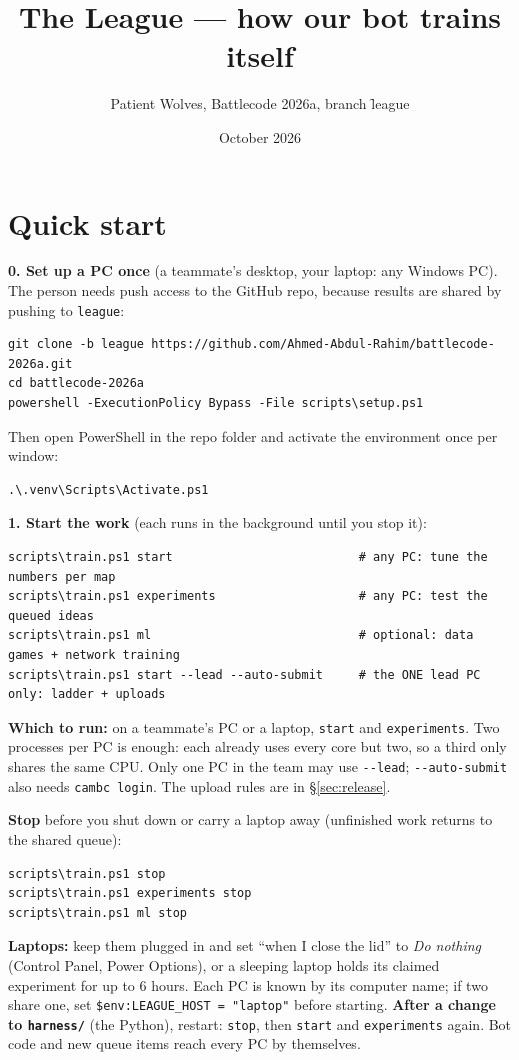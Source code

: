 \documentclass[11pt,a4paper]{article}
\title{The League --- how our bot trains itself}
\author{Patient Wolves, Battlecode 2026a, branch \f{league}}
\date{October 2026}
\newcommand{\f}[1]{\texttt{#1}}
\begin{document}
\maketitle

\section*{Quick start}
\textbf{0. Set up a PC once} (a teammate's desktop, your laptop: any Windows PC). The person needs
push access to the GitHub repo, because results are shared by pushing to \f{league}:
\begin{lstlisting}
git clone -b league https://github.com/Ahmed-Abdul-Rahim/battlecode-2026a.git
cd battlecode-2026a
powershell -ExecutionPolicy Bypass -File scripts\setup.ps1
\end{lstlisting}
Then open PowerShell in the repo folder and activate the environment once per window:
\begin{lstlisting}
.\.venv\Scripts\Activate.ps1
\end{lstlisting}

\textbf{1. Start the work} (each runs in the background until you stop it):
\begin{lstlisting}
scripts\train.ps1 start                          # any PC: tune the numbers per map
scripts\train.ps1 experiments                    # any PC: test the queued ideas
scripts\train.ps1 ml                             # optional: data games + network training
scripts\train.ps1 start --lead --auto-submit     # the ONE lead PC only: ladder + uploads
\end{lstlisting}
\textbf{Which to run:} on a teammate's PC or a laptop, \f{start} and \f{experiments}. Two processes
per PC is enough: each already uses every core but two, so a third only shares the same CPU. Only
one PC in the team may use \f{-{}-lead}; \f{-{}-auto-submit} also needs \f{cambc login}. The upload
rules are in \S\ref{sec:release}.

\textbf{Stop} before you shut down or carry a laptop away (unfinished work returns to the shared
queue):
\begin{lstlisting}
scripts\train.ps1 stop
scripts\train.ps1 experiments stop
scripts\train.ps1 ml stop
\end{lstlisting}
\textbf{Laptops:} keep them plugged in and set ``when I close the lid'' to \emph{Do nothing}
(Control Panel, Power Options), or a sleeping laptop holds its claimed experiment for up to 6 hours.
Each PC is known by its computer name; if two share one, set \f{\$env:LEAGUE\_HOST = "laptop"} before
starting. \textbf{After a change to \f{harness/}} (the Python), restart: \f{stop}, then \f{start} and
\f{experiments} again. Bot code and new queue items reach every PC by themselves.
\end{document}
